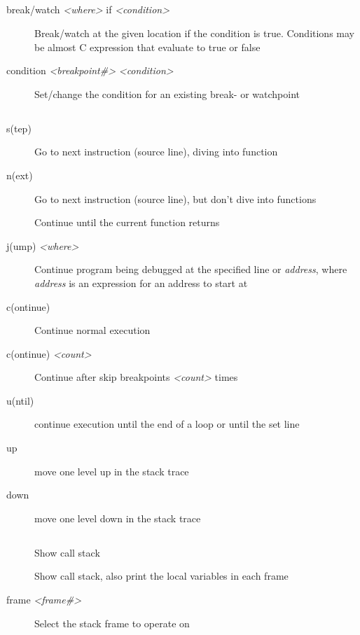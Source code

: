 \documentclass[10pt,landscape,a4paper]{article}
\newcommand{\blacksubsection}[1]{\subsection{\colorbox{black}{\makebox[\linewidth][c]{\textcolor{white}{#1}}}}}
\begin{document}
\begin{multicols}{3}
    \blacksubsection{Conditions}
      \begin{description}
        \item[break/watch \textit{<where>} if \textit{<condition>}]
              Break/watch at the given location if the condition is true. Conditions may be
              almost C expression that evaluate to true or false
        \item[condition \textit{<breakpoint\#>} \textit{<condition>}]
              Set/change the condition for an existing break- or watchpoint
        \item[]   
      \end{description}

    \blacksubsection{Movement}
      \begin{description}
        \item[s(tep)] Go to next instruction (source line), diving into function
        \item[n(ext)] Go to next instruction (source line), but don't dive into functions
        \item[\parbox{4cm}{ \vspace{0.1cm} fin(ish) \\ return \vspace{0.1cm}}] Continue until the current function returns
        \item[j(ump) \textit{<where>}] Continue program being debugged at the specified line or \textit{address}, where
                                       \textit{address} is an expression for an address to start at
        \item[c(ontinue)] Continue normal execution
        \item[c(ontinue) \textit{<count>}] Continue after skip breakpoints \textit{<count>} times
        \item[u(ntil)] continue execution until the end of a loop or until the set line
        \item[up] move one level up in the stack trace
        \item[down] move one level down in the stack trace
      \end{description}

    \blacksubsection{Examining the stack}
      \begin{description}
        \item[\parbox{4cm}{ \vspace{0.1cm} b(ack)t(race) \\ where \vspace{0.1cm}}] Show call stack
        \item[\parbox{4cm}{ \vspace{0.1cm} backtrace full \\ where full \vspace{0.1cm}}] Show call stack, also print the local variables in each frame
        \item[frame \textit{<frame\#>}] Select the stack frame to operate on
      \end{description}


\end{multicols}
\end{document}
